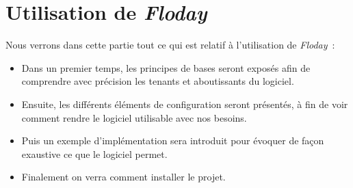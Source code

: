 \section{Utilisation de \emph{Floday}}

\begin{intro}
	Nous verrons dans cette partie tout ce qui est relatif à l'utilisation de \emph{Floday}~:
	\begin{itemize}
		\item Dans un premier temps, les principes de bases seront exposés afin de comprendre avec précision les tenants et aboutissants du logiciel.
		\item Ensuite, les différents éléments de configuration seront présentés, à fin de voir comment rendre le logiciel utilisable avec nos besoins.
		\item Puis un exemple d'implémentation sera introduit pour évoquer de façon exaustive ce que le logiciel permet.
		\item Finalement on verra comment installer le projet.
	\end{itemize}
\end{intro}








